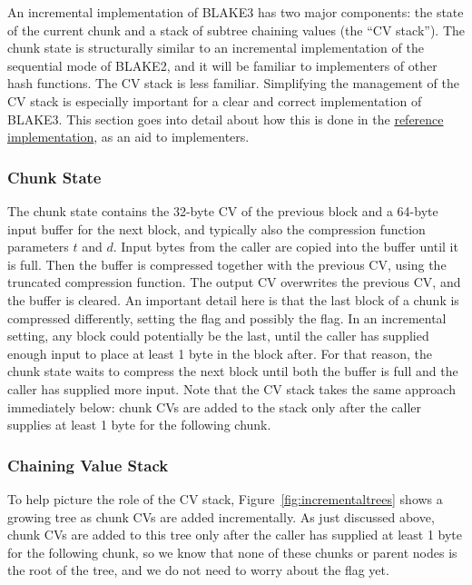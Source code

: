 \documentclass[11pt,notitlepage,a4paper]{article}
\newcommand{\flag}[1]{\texttt{\detokenize{#1}}\xspace}
\begin{document}
An incremental implementation of BLAKE3 has two major components: the state of
the current chunk and a stack of subtree chaining values (the ``CV stack'').
The chunk state is structurally similar to an incremental implementation of the
sequential mode of BLAKE2, and it will be familiar to implementers of other
hash functions. The CV stack is less familiar. Simplifying the management of
the CV stack is especially important for a clear and correct implementation of
BLAKE3. This section goes into detail about how this is done in the
\href{https://github.com/veorq/BLAKE3/blob/master/reference_impl/reference_impl.rs}{reference
implementation}, as an aid to implementers.

\subsubsection{Chunk State}\label{sec:chunkstate}

The chunk state contains the 32-byte CV of the previous block and a 64-byte
input buffer for the next block, and typically also the compression function
parameters $t$ and $d$. Input bytes from the caller are copied into the buffer
until it is full. Then the buffer is compressed together with the previous CV,
using the truncated compression function. The output CV overwrites the previous
CV, and the buffer is cleared. An important detail here is that the last block
of a chunk is compressed differently, setting the \flag{CHUNK_END} flag and
possibly the \flag{ROOT} flag. In an incremental setting, any block could
potentially be the last, until the caller has supplied enough input to place at
least 1 byte in the block after. For that reason, the chunk state waits to
compress the next block until both the buffer is full and the caller has
supplied more input. Note that the CV stack takes the same approach immediately
below: chunk CVs are added to the stack only after the caller supplies at least
1 byte for the following chunk.

\subsubsection{Chaining Value Stack}\label{sec:cvstack}

To help picture the role of the CV stack, Figure~\ref{fig:incrementaltrees}
shows a growing tree as chunk CVs are added incrementally. As just discussed
above, chunk CVs are added to this tree only after the caller has supplied at
least 1 byte for the following chunk, so we know that none of these chunks or
parent nodes is the root of the tree, and we do not need to worry about the
\flag{ROOT} flag yet.
\end{document}
